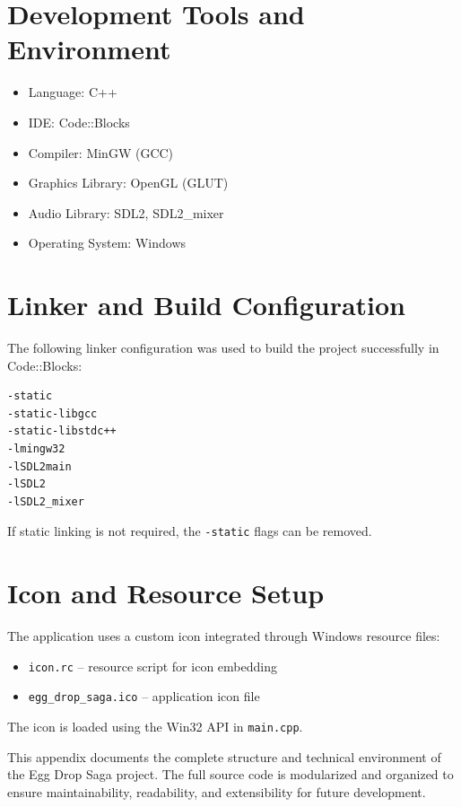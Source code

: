 \documentclass[12pt,a4paper]{report}
\begin{document}
\section{Development Tools and Environment}

\begin{itemize}
    \item Language: C++
    \item IDE: Code::Blocks
    \item Compiler: MinGW (GCC)
    \item Graphics Library: OpenGL (GLUT)
    \item Audio Library: SDL2, SDL2\_mixer
    \item Operating System: Windows
\end{itemize}

\section{Linker and Build Configuration}

The following linker configuration was used to build the project successfully in Code::Blocks:

\begin{verbatim}
-static
-static-libgcc
-static-libstdc++
-lmingw32
-lSDL2main
-lSDL2
-lSDL2_mixer
\end{verbatim}

If static linking is not required, the \texttt{-static} flags can be removed.

\section{Icon and Resource Setup}

The application uses a custom icon integrated through Windows resource files:

\begin{itemize}
    \item \texttt{icon.rc} – resource script for icon embedding
    \item \texttt{egg\_drop\_saga.ico} – application icon file
\end{itemize}

The icon is loaded using the Win32 API in \texttt{main.cpp}.





This appendix documents the complete structure and technical environment of the Egg Drop Saga project. The full source code is modularized and organized to ensure maintainability, readability, and extensibility for future development.
\end{document}
